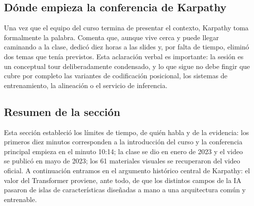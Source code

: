 \subsection{Dónde empieza la conferencia de Karpathy}

Una vez que el equipo del curso termina de presentar el contexto, Karpathy toma formalmente la palabra. Comenta que, aunque vive cerca y puede llegar caminando a la clase, dedicó diez horas a las slides y, por falta de tiempo, eliminó dos temas que tenía previstos. Esta aclaración verbal es importante: la sesión es un conceptual tour deliberadamente condensado, y lo que sigue no debe fingir que cubre por completo las variantes de codificación posicional, los sistemas de entrenamiento, la alineación o el servicio de inferencia.



\subsection{Resumen de la sección}

Esta sección estableció los límites de tiempo, de quién habla y de la evidencia: los primeros diez minutos corresponden a la introducción del curso y la conferencia principal empieza en el minuto 10:14; la clase se dio en enero de 2023 y el video se publicó en mayo de 2023; los 61 materiales visuales se recuperaron del video oficial. A continuación entramos en el argumento histórico central de Karpathy: el valor del Transformer proviene, ante todo, de que los distintos campos de la IA pasaron de islas de características diseñadas a mano a una arquitectura común y entrenable.

